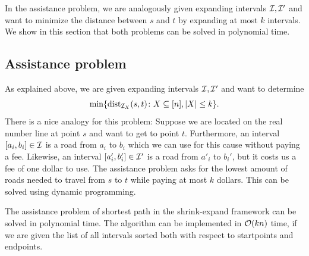 In the assistance problem, we are analogously given expanding intervals $\mathcal{I}, \mathcal{I}'$ and want to minimize the distance between $s$ and $t$ by expanding at most $k$ intervals. We show in this section that both problems can be solved in polynomial time.

\subsection{Assistance problem}
As explained above, we are given expanding intervals $\mathcal{I}, \mathcal{I}'$ and want to determine 
\[ \min \{ \operatorname{\text{dist}}_{\mathcal{I}_X}(s, t) \colon X \subseteq [n], |X| \leq k \}. \]
There is a nice analogy for this problem: Suppose we are located on the real number line at point $s$ and want to get to point $t$. Furthermore, an interval $[a_i, b_i] \in \mathcal{I}$ is a road from $a_i$ to $b_i$ which we can use for this cause without paying a fee. Likewise, an interval $[a_i', b_i'] \in \mathcal{I}'$ is a road from $a'_i$ to $b_i'$, but it costs us a fee of one dollar to use. The assistance problem asks for the lowest amount of roads needed to travel from $s$ to $t$ while paying at most $k$ dollars. This can be solved using dynamic programming. 
\begin{theorem}

The assistance problem of shortest path in the shrink-expand framework can be solved in polynomial time. The algorithm can be implemented in $\mathcal{O}(kn)$ time, if we are given the list of all intervals sorted both with respect to startpoints and endpoints.
\end{theorem}


